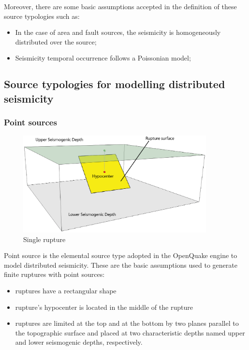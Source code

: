 Moreover, there are some basic assumptions accepted in the definition of these 
source typologies such as:
\begin{itemize}
	\item In the case of area and fault sources, the seismicity is homogeneously 
		distributed over the source; 	
	\item Seismicity temporal occurrence follows a Poissonian model; 
\end{itemize}
\subsection{Source typologies for modelling distributed seismicity}
\subsubsection{Point sources}
\label{hazard:seismic_source_types:pointSources}
\begin{figure}[!ht]
\centering
\includegraphics[width=10cm]{./figures/hazard/single_rupture.eps}
\caption{Single rupture}
\label{fig:single_rupture}
\end{figure}
Point source is the elemental source type adopted in the OpenQuake engine 
to model distributed seismicity. These are the basic assumptions used to 
generate finite ruptures with point sources:
\begin{itemize}
	\item ruptures have a rectangular shape
	\item rupture's hypocenter is located in the middle of the rupture
	\item ruptures are limited at the top and at the bottom by two planes 
	parallel to the topographic surface and placed at two characteristic 
	depths named upper and lower seismogenic depths, respectively.
\end{itemize} 
%
